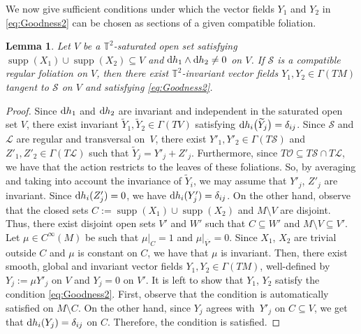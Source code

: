 \documentclass[pdftex]{sigma}%
\newcommand{\dd}{{\rm d}}
\numberwithin{equation}{section}
\newtheorem{Lemma}[Theorem]{Lemma}
\begin{document}
We now give sufficient conditions under which the vector fields $Y_{1}$ and $Y_{2}$ in \eqref{eq:Goodness2} can be chosen as sections of a given compatible foliation.

\begin{Lemma}\label{lemma:Compat}
Let $V$ be a $\mathbb{T}^{2}$-saturated open set satisfying $\operatorname{supp}(X_1) \cup \operatorname{supp}(X_2) \subseteq V$ and $\dd h_1 \wedge \dd h_2 \neq 0$ on $V$. If $\mathcal{S}$ is a compatible regular foliation on $V$, then there exist $\mathbb{T}^{2}$-invariant vector fields $Y_1, Y_{2} \in \Gamma(TM)$ tangent to $\mathcal{S}$ on $V$ and satisfying \eqref{eq:Goodness2}.
\end{Lemma}
\begin{proof}
Since $\dd h_{1}$ and $\dd h_{2}$ are invariant and independent in the saturated open set $V$, there exist invariant $\widetilde{Y}_{1},\widetilde{Y}_{2} \in \Gamma(TV)$ satisfying $\dd h_{i}\big(\widetilde{Y}_{j}\big) = \delta_{ij}$. Since $\mathcal{S}$ and $\mathcal{L}$ are regular and transversal on~$V$, there exist $Y'_1,Y'_2 \in \Gamma(T\mathcal{S})$ and $Z'_1,Z'_2 \in \Gamma(T\mathcal{L})$ such that $\widetilde{Y}_{j} = Y'_{j} + Z'_{j}$. Furthermore, since $T\mathcal{O} \subseteq T\mathcal{S} \cap T\mathcal{L}$, we have that the action restricts to the leaves of these foliations. So, by averaging and taking into account the invariance of $\widetilde{Y}_{i}$, we may assume that $Y'_{j}$, $Z'_{j}$ are invariant. Since $\dd h_{i}(Z'_{j})=0$, we have $\dd h_{i}(Y'_{j}) = \delta_{ij}$. On the other hand, observe that the closed sets $C := \operatorname{supp}(X_1) \cup \operatorname{supp}(X_2)$ and $M \setminus V$ are disjoint. Thus, there exist disjoint open sets $V'$ and $W'$ such that $C \subseteq W'$ and $M \setminus V \subseteq V'$. Let $\mu \in C^{\infty}(M)$ be such that $\mu|_{C} = 1$ and $\mu|_{\overline{V'}} = 0$. Since $X_1$, $X_2$ are trivial outside $C$ and $\mu$ is constant on $C$, we have that $\mu$ is invariant. Then, there exist smooth, global and invariant vector fields $Y_1,Y_2 \in \Gamma(TM)$, well-defined by $Y_{j} := \mu Y'_{j}$ on $V$ and $Y_{j} = 0$ on $V'$. It is left to show that $Y_1$, $Y_2$ satisfy the condition \eqref{eq:Goodness2}. First, observe that the condition is automatically satisfied on $M \setminus C$. On the other hand, since $Y_{j}$ agrees with~$Y'_{j}$ on $C \subseteq V$, we get that $\dd h_{i}(Y_{j}) = \delta_{ij}$ on $C$. Therefore, the condition is satisfied.
\end{proof}
\end{document}
